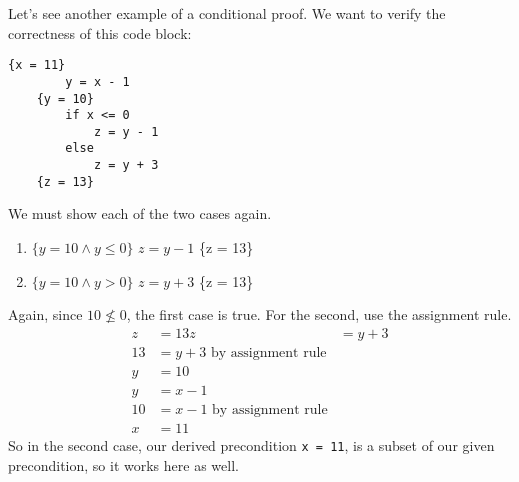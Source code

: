\documentclass[nobib]{tufte-handout}
\begin{document}
Let's see another example of a conditional proof. We want to verify 
the correctness of this code block: 
\begin{lstlisting}[caption=Example]
    {x = 11}
        y = x - 1
    {y = 10}
        if x <= 0
            z = y - 1
        else 
            z = y + 3
    {z = 13}
\end{lstlisting}
We must show each of the two cases again. 
\begin{enumerate}
    \item $\{y = 10 \land y \leq 0\}$ $z = y - 1$ \{z = 13\}
    \item  $\{y = 10 \land y > 0\}$ $z = y + 3$ \{z = 13\}
\end{enumerate}
Again, since $10 \nleq 0 $, the first case is true. 
For the second, use the assignment rule.  
\begin{align*}
    z &= 13
    z &= y + 3 \\
    13 &= y + 3 \text{ by assignment rule} \\
    y &= 10 \\
    y &= x-1 \\
    10 &= x-1 \text{ by assignment rule} \\
    x &= 11
\end{align*}
So in the second case, our derived precondition \texttt{x = 11}, is a subset 
of our given precondition, so it works here as well. 
\end{document}
